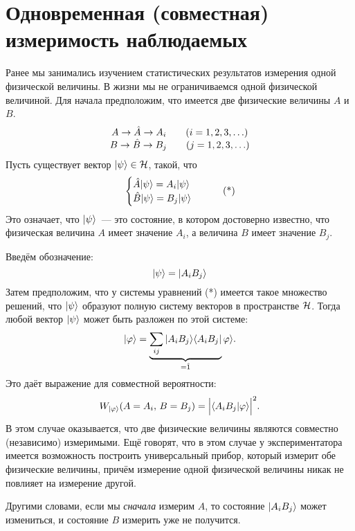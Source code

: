 \section{Одновременная (совместная) измеримость наблюдаемых}
\Rem Ранее мы занимались изучением статистических результатов измерения одной физической величины. В жизни мы не ограничиваемся одной физической величиной. Для начала предположим, что имеется две физические величины $A$ и $B$.
$$
    \begin{array}{c}
      A \to \Hat A \to A_i \qquad (i = 1, 2, 3, \ldots) \\
      B \to \Hat B \to B_j \qquad (j = 1, 2, 3, \ldots)
    \end{array}
$$
Пусть существует вектор $| \psi \rangle \in \mathcal H$, такой, что
\begin{equation}
    \begin{cases}
      \Hat A | \psi \rangle = A_i | \psi \rangle \\
      \Hat B | \psi \rangle = B_j | \psi \rangle
    \end{cases}\tag{*}
\end{equation}
Это означает, что $| \psi \rangle$~--- это состояние, в котором достоверно известно, что физическая величина $A$ имеет значение $A_i$, а величина $B$ имеет значение $B_j$.

Введём обозначение:
$$
    | \psi \rangle = | A_i B_j \rangle
$$
Затем предположим, что у системы уравнений (*) имеется такое множество решений, что $| \psi \rangle$ образуют полную систему векторов в пространстве $\mathcal H$. Тогда любой вектор $| \psi \rangle$ может быть разложен по этой системе:
$$
    | \varphi \rangle = \underbrace{\sum_{ij} | A_i B_j \rangle \langle A_i B_j |}_{ = \Hat 1} \varphi \rangle.
$$
Это даёт выражение для совместной вероятности:
$$
    W_{| \varphi \rangle} (A = A_i, \, B = B_j) = \Big| \langle A_i B_j | \varphi \rangle \Big| ^2.
$$
\Rem В этом случае оказывается, что две физические величины являются совместно (независимо) измеримыми. Ещё говорят, что в этом случае у экспериментатора имеется возможность построить универсальный прибор, который измерит обе физические величины, причём измерение одной физической величины никак не повлияет на измерение другой.

Другими словами, если мы \emph{сначала} измерим $A$, то состояние $| A_i B_j \rangle$ может измениться, и состояние $B$ измерить уже не получится.


